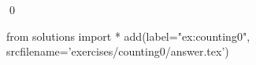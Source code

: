 
\begin{ex} 
  \label{ex:counting0}
  
  \qed
\end{ex} 
\begin{python0}
from solutions import *
add(label="ex:counting0",
    srcfilename='exercises/counting0/answer.tex') 
\end{python0}
